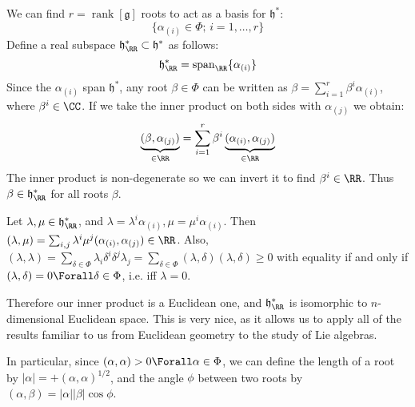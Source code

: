 \documentclass{jknotes}
\begin{document}
We can find \(r = \operatorname{rank}[\mathfrak{g}]\) roots to act as a basis for \(\mathfrak{h}^*\):
\begin{equation}
    \{\alpha_{(i)} \in \Phi;\,i=1,\dots,r\}
\end{equation}
Define a real subspace \(\mathfrak{h}^*_\RR \subset \mathfrak{h}^*\) as follows:
\begin{equation}
    \mathfrak{h}^*_\RR = \operatorname{span}_\RR \{\alpha_{(i)}\}
\end{equation}
Since the \(\alpha_{(i)}\) span \(\mathfrak{h}^*\), any root \(\beta \in \Phi\) can be written as \(\beta = \sum_{i=1}^r \beta^i\alpha_{(i)}\), where \(\beta^i \in \CC\). If we take the inner product on both sides with \(\alpha_{(j)}\) we obtain:
\begin{equation}
    \underbrace{(\beta,\alpha_{(j)})}_{\in\RR} = \sum_{i=1}^r \beta^i \underbrace{(\alpha_{(i)},\alpha_{(j)})}_{\in\RR}
\end{equation}
The inner product is non-degenerate so we can invert it to find \(\beta^i \in \RR\). Thus \(\beta \in \mathfrak{h}^*_\RR\) for all roots \(\beta\).

Let \(\lambda,\mu \in \mathfrak{h}^*_\RR\), and \(\lambda = \lambda^i\alpha_{(i)},\mu = \mu^i\alpha_{(i)}\). Then \((\lambda,\mu) = \sum_{i,j} \lambda^i\mu^j(\alpha_{(i)},\alpha_{(j)}) \in \RR\). Also, \((\lambda,\lambda) = \sum_{\delta\in\Phi} \lambda_i\delta^i\delta^j\lambda_j = \sum_{\delta\in\Phi} (\lambda,\delta)(\lambda,\delta) \ge 0\) with equality if and only if \((\lambda,\delta) = 0 \Forall \delta \in \Phi\), i.e. iff \(\lambda = 0\).

Therefore our inner product is a Euclidean one, and \(\mathfrak{h}^*_\RR\) is isomorphic to \(n\)-dimensional Euclidean space. This is very nice, as it allows us to apply all of the results familiar to us from Euclidean geometry to the study of Lie algebras.

In particular, since \((\alpha,\alpha) > 0 \Forall \alpha \in \Phi\), we can define the length of a root by \(|\alpha| = + (\alpha,\alpha)^{1/2}\), and the angle \(\phi\) between two roots by \((\alpha,\beta) = |\alpha||\beta|\cos\phi\).

\begin{figure}[H]
    \centering
    \label{fig:rootangle}
\end{figure}
\end{document}
